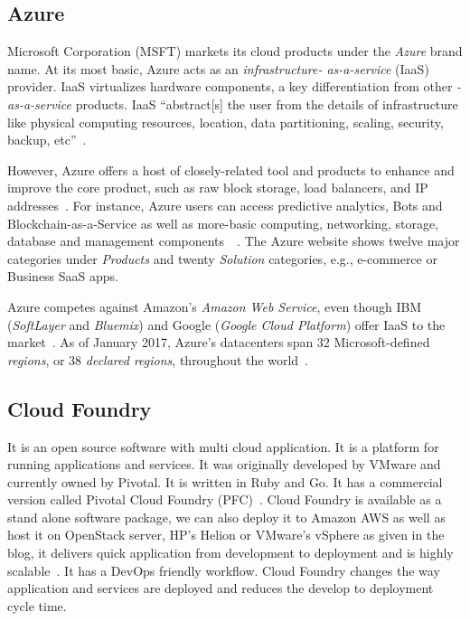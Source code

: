 \subsection{Azure}

Microsoft Corporation (MSFT) markets its cloud products under the
\textit{Azure} brand name. At its most basic, Azure acts as an
\textit{infrastructure- as-a-service} (IaaS) provider.  IaaS virtualizes
hardware components, a key differentiation from other \textit{-as-a-service}
products. IaaS ``abstract[s] the user from the details of
infrastructure like physical computing resources, location, data
partitioning, scaling, security, backup,
etc''~\cite{www-wikipedia-cloud}.

However, Azure offers a host of closely-related tool and products to
enhance and improve the core product, such as raw block storage, load
balancers, and IP addresses~\cite{www-azure-msft}. For instance, Azure
users can access predictive analytics, Bots and
Blockchain-as-a-Service as well as more-basic computing, networking,
storage, database and management
components~\cite{www-sec-edgar-msft}~\cite{www-azure-msft}.  The Azure
website shows twelve major categories under \textit{Products} and twenty
\textit{Solution} categories, e.g., e-commerce or Business SaaS apps.

Azure competes against Amazon's \textit{Amazon Web Service}, even though IBM
(\textit{SoftLayer} and \textit{Bluemix}) and Google (\textit{Google Cloud Platform})
offer IaaS to the market~\cite{www-aws-amzn, www-softlayer-ibm,
  www-bluemix-ibm,www-cloud-google}.  As of January 2017, Azure's
datacenters span 32 Microsoft-defined \textit{regions}, or 38 \textit{declared
regions}, throughout the world~\cite{www-azure-msft}.

    \pv

\subsection{Cloud Foundry}

It is an open source software with multi cloud application. It is a
platform for running applications and services. It was originally
developed by VMware and currently owned by Pivotal. It is written in
Ruby and Go. It has a commercial version called Pivotal Cloud Foundry
(PFC)~\cite{www-cloudfoundry-book}. Cloud Foundry is available as a
stand alone software package, we can also deploy it to Amazon AWS as
well as host it on OpenStack server, HP's Helion or VMware's vSphere
as given in the blog, it delivers quick application from development
to deployment and is highly scalable~\cite{www-cloudfoundry-blog}. It
has a DevOps friendly workflow.  Cloud Foundry changes the way
application and services are deployed and reduces the develop to
deployment cycle time.

